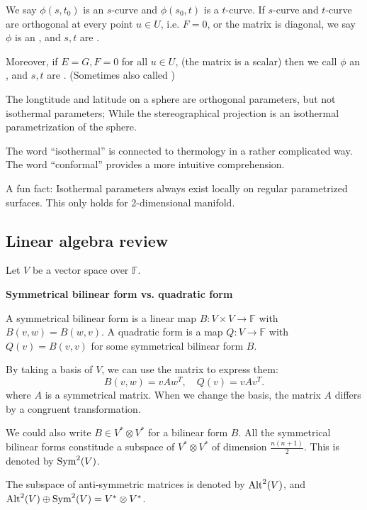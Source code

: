 
We say $\phi(s,t_0)$ is an $s$-curve and $\phi(s_0,t)$ is a $t$-curve.
If $s$-curve and $t$-curve are orthogonal at every point $u\in U$,
i.e. $F = 0$, or the matrix is diagonal,
we say  $\phi$ is an ,
and $s,t$ are .

Moreover, if $E=G, F=0$ for all  $u\in U$, (the matrix is a scalar)
then we call  $\phi$ an
, and $s,t$ are .
(Sometimes also called )

\begin{example}
    The longtitude and latitude on a sphere are orthogonal parameters,
	but not isothermal parameters;
	While the stereographical projection is an isothermal parametrization of the sphere.
\end{example}

\begin{remark}
    The word ``isothermal'' is connected to thermology in a rather complicated way.
	The word ``conformal'' provides a more intuitive comprehension.
\end{remark}
\begin{remark}
    A fun fact: Isothermal parameters always exist locally on
	regular parametrized surfaces. This only holds for 2-dimensional
	manifold.
\end{remark}

\subsection{Linear algebra review}
\label{sub:Linear algebra review}

Let $V$ be a vector space over $\mathbb{F}$.

\textbf{Symmetrical bilinear form vs. quadratic form}

A symmetrical bilinear form is a linear map $B: V\times V\to \mathbb{F}$
with $B(v,w)=B(w,v)$.
A quadratic form is a map $Q:V\to \mathbb{F}$ with $Q(v) = B(v,v)$ for
some symmetrical bilinear form  $B$.

By taking a basis of $V$, we can use the matrix to express them:
 \[
B(v,w) = vAw^T, \quad Q(v) = vAv^T.
\]
where $A$ is a symmetrical matrix.
When we change the basis, the matrix  $A$ differs by a congruent transformation.

We could also write $B\in V^*\otimes V^*$ for a bilinear form $B$.
All the symmetrical bilinear forms constitude a subspace of  $V^*\otimes V^*$
of dimension  $\frac{n(n+1)}{2}$. This is denoted by $\operatorname{Sym}^2(V)$.
\begin{remark}
    The subspace of anti-symmetric matrices is denoted by $\operatorname{Alt}^2(V)$,
	and  $\operatorname{Alt}^2(V)\oplus \operatorname{Sym}^2(V) = V^*\otimes V^*$.
\end{remark}

